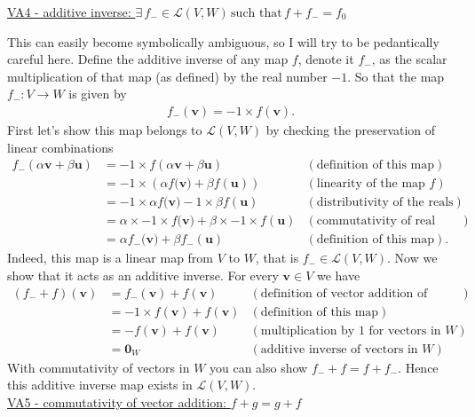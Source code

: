 \noindent \underline{VA4 - additive inverse: $\exists \, f_- \in \mathcal{L}(V,W) \, \text{such that} \, f + f_- = f_0$}

\noindent This can easily become symbolically ambiguous, so I will try to be pedantically careful here. Define the additive inverse of any map $f$, denote it $f_-$, as the scalar multiplication of that map (as defined) by the real number $-1$. So that the map $f_-:V\to W$ is given by
\begin{align*}
f_-(\mathbf{v}) = -1 \times f(\mathbf{v}).
\end{align*}
First let's show this map belongs to $\mathcal{L}(V,W)$ by checking the preservation of linear combinations
\begin{align*}
f_-(\alpha \mathbf{v} + \beta \mathbf{u}) &= -1\times f(\alpha \mathbf{v} + \beta \mathbf{u})  &  (\text{definition of this map}) \\
%
 &= -1\times \left( \alpha f(\mathbf{v)} + \beta f(\mathbf{u}) \right)  &  (\text{linearity of the map $f$}) \\
%
 &= -1\times \alpha f(\mathbf{v)} -1\times \beta f(\mathbf{u})  &  (\text{distributivity of the reals}) \\
%
 &= \alpha \times -1\times f(\mathbf{v)} + \beta \times -1\times f(\mathbf{u})  &  (\text{commutativity of real multiplication}) \\
%
 &= \alpha f_-(\mathbf{v)} + \beta f_-(\mathbf{u})  &  (\text{definition of this map}).
\end{align*}
Indeed, this map is a linear map from $V$ to $W$, that is $f_- \in \mathcal{L}(V,W)$. Now we show that it acts as an additive inverse. For every $\mathbf{v}\in V$ we have
\begin{align*}
(f_- + f)(\mathbf{v}) &= f_-(\mathbf{v}) + f(\mathbf{v})  &  (\text{definition of vector addition of linear maps}) \\
%
 &= -1\times f(\mathbf{v}) + f(\mathbf{v})  &  (\text{definition of this map}) \\
%
 &= -f(\mathbf{v}) + f(\mathbf{v})  &  (\text{multiplication by 1 for vectors in $W$}) \\
%
 &= \mathbf{0}_W  &  (\text{additive inverse of vectors in $W$})
\end{align*}
With commutativity of vectors in $W$ you can also show $f_- + f = f + f_-$. Hence this additive inverse map exists in $\mathcal{L}(V,W)$.
\\


\noindent \underline{VA5 - commutativity of vector addition: $f + g  = g + f$}

